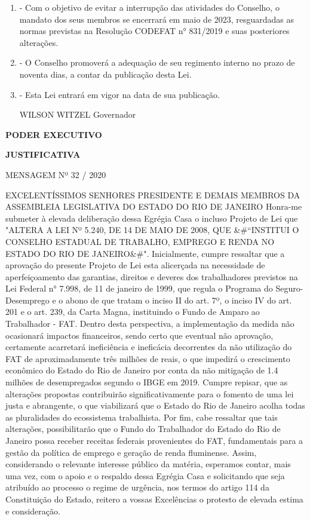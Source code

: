 \documentclass[10pt]{article}
\begin{document}
\begin{enumerate}[label=\Roman*]
\item - Com o objetivo de evitar a interrupção das atividades do Conselho, o mandato dos seus membros se encerrará em maio de 2023, resguardadas as normas previstas na Resolução CODEFAT n° 831/2019 e suas posteriores alterações. 
\item - O Conselho promoverá a adequação de seu regimento interno no prazo de noventa dias, a contar da publicação desta Lei.
\item - Esta Lei entrará em vigor na data de sua publicação.


WILSON WITZEL
Governador


\end{enumerate}




\begin{center}
  

   \bigskip

  \textbf{  PODER EXECUTIVO}

  \bigskip

  \textbf{JUSTIFICATIVA}
  \bigskip

\end{center}

  MENSAGEM Nº 32  / 2020          


EXCELENTÍSSIMOS SENHORES PRESIDENTE E DEMAIS MEMBROS DA ASSEMBLEIA LEGISLATIVA DO ESTADO DO RIO DE JANEIRO
Honra-me submeter à elevada deliberação dessa Egrégia Casa o incluso Projeto de Lei que "ALTERA A LEI Nº 5.240, DE 14 DE MAIO DE 2008, QUE &#``INSTITUI O CONSELHO ESTADUAL DE TRABALHO, EMPREGO E RENDA NO ESTADO DO RIO DE JANEIRO&#".
Inicialmente, cumpre ressaltar que a aprovação do presente Projeto de Lei esta alicerçada na necessidade de aperfeiçoamento das garantias, direitos e deveres dos trabalhadores previstos na Lei Federal n° 7.998, de 11 de janeiro de 1999, que regula o Programa do Seguro-Desemprego e o abono de que tratam o inciso II do art. 7º, o inciso IV do art. 201 e o art. 239, da Carta Magna, instituindo o Fundo de Amparo ao Trabalhador - FAT. 
Dentro desta perspectiva, a implementação da medida não ocasionará impactos financeiros, sendo certo que eventual não aprovação, certamente acarretará ineficiência e ineficácia decorrentes da não utilização do FAT de aproximadamente três milhões de reais, o que impedirá o crescimento econômico do Estado do Rio de Janeiro por conta da não mitigação de 1.4 milhões de desempregados segundo o IBGE em 2019.
Cumpre repisar, que as alterações propostas contribuirão significativamente para o fomento de uma lei justa e abrangente, o que viabilizará que o Estado do Rio de Janeiro acolha todas as pluralidades do ecossistema trabalhista.
Por fim, cabe ressaltar que tais alterações, possibilitarão que o Fundo do Trabalhador do Estado do Rio de Janeiro possa receber receitas federais provenientes do FAT, fundamentais para a gestão da política de emprego e geração de renda fluminense.
Assim, considerando o relevante interesse público da matéria, esperamos contar, mais uma vez, com o apoio e o respaldo dessa Egrégia Casa e solicitando que seja atribuído ao processo o regime de urgência, nos termos do artigo 114 da Constituição do Estado, reitero a vossas Excelências o protesto de elevada estima e consideração.
\end{document}
